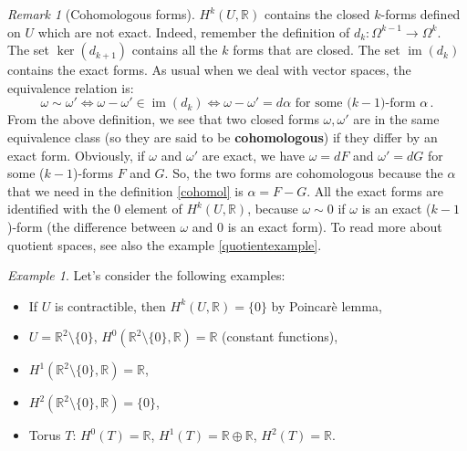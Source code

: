 \documentclass[a4paper,11pt,titlepage, article, oneside]{memoir}
\numberwithin{equation}{section}
\theoremstyle{definition}
\theoremstyle{remark}
\newtheorem{remark}[theorem]{Remark}
\newtheorem{example}[theorem]{Example}
\DeclareMathOperator{\im}{im}
\newcommand{\rfield}{\mathbb{R}}
\begin{document}
\begin{remarkbox}\begin{remark}[Cohomologous forms]
  $H^k(U, \rfield)$ contains the closed $k$-forms defined on $U$ which are not exact. Indeed, remember the definition of $d_k\colon \Omega^{k-1} \rightarrow \Omega^k $. The set $\ker(d_{k+1})$ contains all the $k$ forms that are closed. The set $\im(d_k)$ contains the exact forms. As usual when we deal with vector spaces, the equivalence relation is:
  \begin{equation} \label{cohomol}
  \omega \sim \omega' \Leftrightarrow \omega - \omega' \in \im(d_k) \Leftrightarrow \omega - \omega' = d\alpha \text{ for some (} k-1 \text{)-form } \alpha \, .
  \end{equation}
  From the above definition, we see that two closed forms $\omega, \omega'$ are in the same equivalence class (so they are said to be \textbf{cohomologous}) if they differ by an exact form.
  Obviously, if $\omega$ and $\omega'$ are exact, we have $\omega = dF$ and $\omega'=dG$ for some ($k-1$)-forms $F$ and $G$. So, the two forms are cohomologous because the $\alpha$ that we need in the definition \eqref{cohomol} is $\alpha = F - G$. All the exact forms are identified with the 0 element of $H^k(U, \rfield)$, because $\omega \sim 0$ if $\omega$ is an exact ($k-1$)-form (the difference between $\omega$ and 0 is an exact form).
  To read more about quotient spaces, see also the example \ref{quotientexample}.
\end{remark}\end{remarkbox}

\begin{tcolorbox}\begin{example}
  Let's consider the following examples:
  \begin{itemize}
    \item If $U$ is contractible, then $H^k(U, \rfield) = \{0\}$ by Poincarè lemma,
    \item $U=\rfield^2 \setminus \{0\}$, $H^0(\rfield^2 \setminus \{0\}, \rfield) = \rfield$ (constant functions),
    \item $H^1(\rfield^2 \setminus \{0\}, \rfield) = \rfield$,
    \item $H^2(\rfield^2 \setminus \{0\}, \rfield) = \{0\}$,
    \item Torus $T$: $H^0(T) = \rfield$,  $H^1(T) = \rfield \oplus \rfield$, $H^2(T) = \rfield$.
  \end{itemize}
\end{example}\end{tcolorbox}
\end{document}
